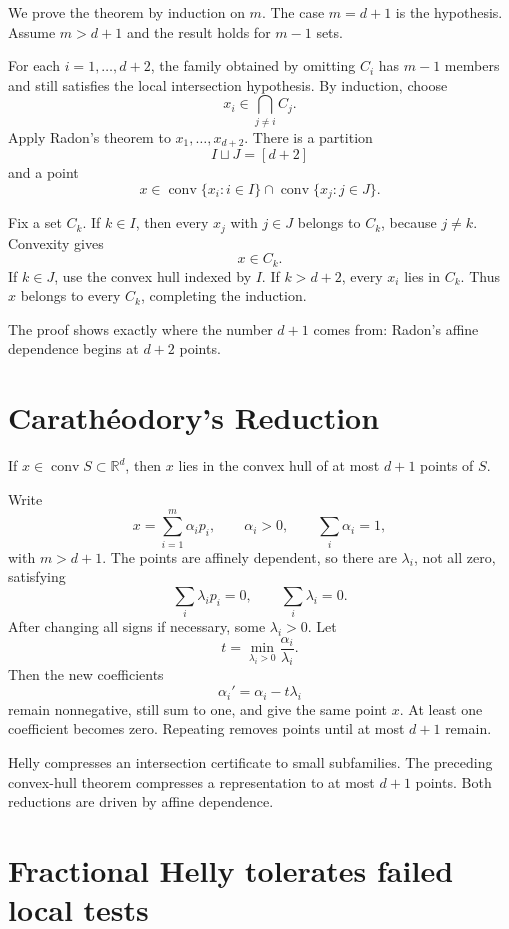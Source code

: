We prove the theorem by induction on \(m\).  The case \(m=d+1\) is the hypothesis.  Assume \(m>d+1\) and the result holds for \(m-1\) sets.

For each \(i=1,\ldots,d+2\), the family obtained by omitting \(C_i\) has \(m-1\) members and still satisfies the local intersection hypothesis.  By induction, choose
\[
  x_i\in\bigcap_{j\ne i}C_j.
\]
Apply Radon's theorem to \(x_1,\ldots,x_{d+2}\).  There is a partition
\[
  I\sqcup J=[d+2]
\]
and a point
\[
  x\in\operatorname{conv}\{x_i:i\in I\}
  \cap
  \operatorname{conv}\{x_j:j\in J\}.
\]

Fix a set \(C_k\).  If \(k\in I\), then every \(x_j\) with \(j\in J\) belongs to \(C_k\), because \(j\ne k\).  Convexity gives
\[
  x\in C_k.
\]
If \(k\in J\), use the convex hull indexed by \(I\).  If \(k>d+2\), every \(x_i\) lies in \(C_k\).  Thus \(x\) belongs to every \(C_k\), completing the induction.

The proof shows exactly where the number \(d+1\) comes from: Radon's affine dependence begins at \(d+2\) points.

\section{Carathéodory's Reduction}

\begin{theorem}[Carathéodory]
If \(x\in\operatorname{conv}S\subset\mathbb R^d\), then \(x\) lies in the convex hull of at most \(d+1\) points of \(S\).
\end{theorem}

Write
\[
  x=\sum_{i=1}^m\alpha_i p_i,
  \qquad
  \alpha_i>0,
  \qquad
  \sum_i\alpha_i=1,
\]
with \(m>d+1\).  The points are affinely dependent, so there are \(\lambda_i\), not all zero, satisfying
\[
  \sum_i\lambda_i p_i=0,
  \qquad
  \sum_i\lambda_i=0.
\]
After changing all signs if necessary, some \(\lambda_i>0\).  Let
\[
  t=\min_{\lambda_i>0}\frac{\alpha_i}{\lambda_i}.
\]
Then the new coefficients
\[
  \alpha_i'=\alpha_i-t\lambda_i
\]
remain nonnegative, still sum to one, and give the same point \(x\).  At least one coefficient becomes zero.  Repeating removes points until at most \(d+1\) remain.

Helly compresses an intersection certificate to small subfamilies.  The preceding convex-hull theorem compresses a representation to at most \(d+1\) points.  Both reductions are driven by affine dependence.

\section{Fractional Helly tolerates failed local tests}

